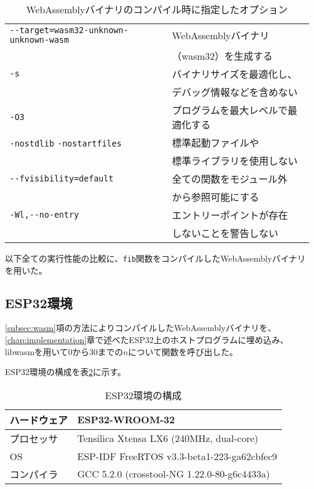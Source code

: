 \begin{table}[htbp]
  \label{tab:compiler}
  \caption{WebAssemblyバイナリのコンパイル時に指定したオプション}
  \begin{center}
    \begin{tabular}{ll}
    \hline
    \verb|--target=wasm32-unknown-unknown-wasm| & WebAssemblyバイナリ \\
    & （wasm32）を生成する \\ \hline
    \verb|-s| & バイナリサイズを最適化し、 \\
    & デバッグ情報などを含めない \\ \hline
    \verb|-O3| & プログラムを最大レベルで最適化する \\ \hline
    \verb|-nostdlib| \verb|-nostartfiles| & 標準起動ファイルや\\
    & 標準ライブラリを使用しない \\ \hline
    \verb|--fvisibility=default| & 全ての関数をモジュール外 \\
    & から参照可能にする \\ \hline
    \verb|-Wl,--no-entry| & エントリーポイントが存在 \\
    & しないことを警告しない \\ \hline
    \end{tabular}
  \end{center}
\end{table}

以下全ての実行性能の比較に、\verb|fib|関数をコンパイルしたWebAssemblyバイナリを用いた。

\newpage

\subsection{ESP32環境}

\ref{subsec:wasm}項の方法によりコンパイルしたWebAssemblyバイナリを、\ref{chap:implementation}章で述べたESP32上のホストプログラムに埋め込み、libwasmを用いて0から30までの$n$について関数を呼び出した。

ESP32環境の構成を表\ref{tab:esp_spec}に示す。

\begin{table}[htbp]
  \label{tab:esp_spec}
  \caption{ESP32環境の構成}
  \begin{center}
    \begin{tabular}{|l|l|}
    \hline
    ハードウェア & ESP32-WROOM-32 \\ \hline
    プロセッサ & Tensilica Xtensa LX6 (240MHz, dual-core) \\ \hline
    OS & ESP-IDF FreeRTOS v3.3-beta1-223-ga62cbfec9 \\ \hline
    コンパイラ & GCC 5.2.0 (crosstool-NG 1.22.0-80-g6c4433a) \\ \hline
    \end{tabular}
  \end{center}
\end{table}

